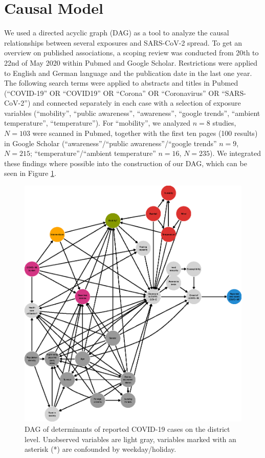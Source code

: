 \documentclass[]{elsarticle} %
\begin{document}
\hypertarget{causal-model}{%
\section{Causal Model}\label{causal-model}}

We used a directed acyclic graph (DAG) \citep{schipf_directed_2011, textor_robust_2017} as a tool to analyze the causal relationships between several exposures and SARS-CoV-2 spread. To get an overview on published associations, a scoping review was conducted from 20th to 22nd of May 2020 within Pubmed and Google Scholar. Restrictions were applied to English and German language and the publication date in the last one year. The following search terms were applied to abstracts and titles in Pubmed (``COVID-19'' OR ``COVID19'' OR ``Corona'' OR ``Coronavirus'' OR ``SARS-CoV-2'') and connected separately in each case with a selection of exposure variables (``mobility'', ``public awareness'', ``awareness'', ``google trends'', ``ambient temperature'', ``temperature''). For ``mobility'', we analyzed \(n=8\) studies, \(N=103\) were scanned in Pubmed, together with the first ten pages (100 results) in Google Scholar (``awareness''/``public awareness''/``google trends'' \(n=9\), \(N=215\); ``temperature''/``ambient temperature'' \(n=16\), \(N=235\)). We integrated these findings where possible into the construction of our DAG, which can be seen in Figure \ref{fig:dag-covid-19}.

\begin{figure}
\centering
\includegraphics{figures/f_full_covid19_dag_klein.eps}
\caption{\label{fig:dag-covid-19}DAG of determinants of reported COVID-19 cases on the district level. Unobserved variables are light gray, variables marked with an asterisk (*) are confounded by weekday/holiday.}
\end{figure}
\end{document}
